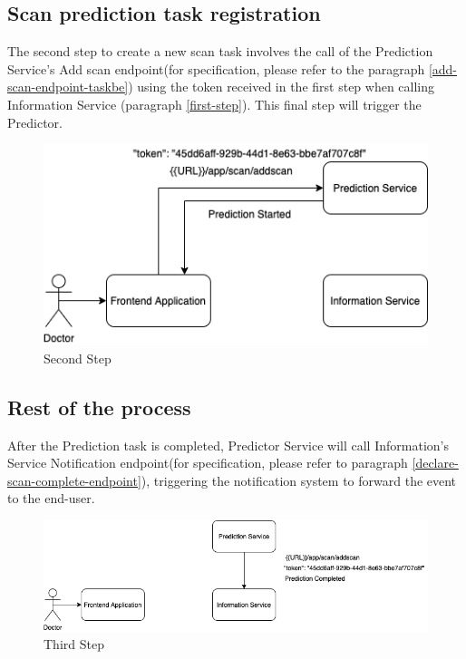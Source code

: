 		\subsection{Scan prediction task registration}
			
			The second step to create a new scan task involves the call of the Prediction Service's Add scan endpoint(for specification, 
			please refer to the paragraph \ref{add-scan-endpoint-taskbe}) using the token received in the first step when calling Information Service 
			(paragraph \ref{first-step}). This final step will trigger the Predictor.
			\begin{figure}[H]
				\iftrue
				\caption{Second Step}
				\centering
				\includegraphics[scale=0.6]{figures/sca-creation-sequence-1-Page-2-2}
				\fi
			\end{figure}
		\subsection{Rest of the process}
		
			After the Prediction task is completed, Predictor Service will call Information's Service Notification endpoint(for specification, 
			please refer to paragraph \ref{declare-scan-complete-endpoint}), triggering the notification system to forward the event to 
			the end-user.

			\begin{figure}[H]
				\iftrue
				\caption{Third Step}
				\centering
				\includegraphics[scale=0.6]{figures/sca-creation-sequence-1-Page-3-1}
				\fi
			\end{figure}
			
